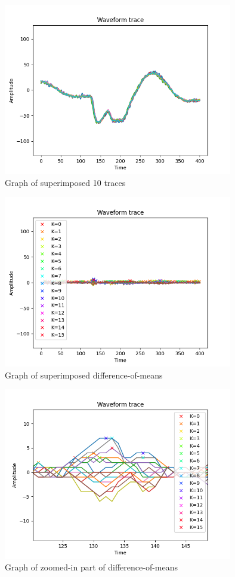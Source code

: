 \documentclass[1p,16pt]{elsarticle}
\begin{document}
\begin{figure}[hb]
	\centering
    \centerline{\includegraphics[width=10cm]{traces_plot}}
    \caption{Graph of superimposed 10 traces}\label{fig:traces_plot}
\end{figure}

\begin{figure}[hb]
	\centering
    \centerline{\includegraphics[width=10cm]{peaks_plot}}
    \caption{Graph of superimposed difference-of-means}\label{fig:peaks_plot}
\end{figure}

\begin{figure}[hb]
	\centering
    \centerline{\includegraphics[width=10cm]{peak_plot}}
    \caption{Graph of zoomed-in part of difference-of-means}\label{fig:peak_plot}
\end{figure}

%
\end{document}
